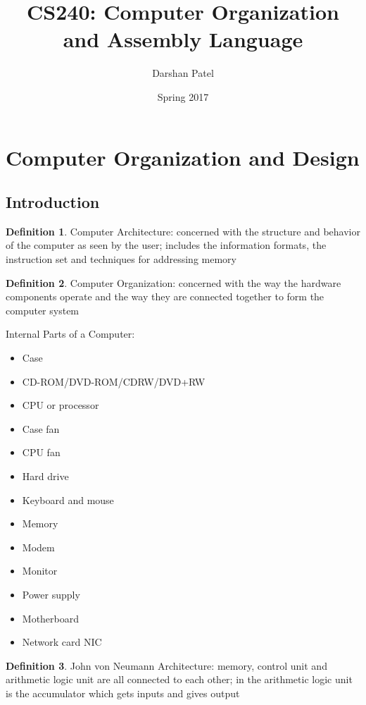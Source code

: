 \documentclass[12pt]{article}
\begin{document}
\theoremstyle{definition}
\newtheorem{theorem}{Theorem}[section]
\newtheorem{definition}{Definition}[section]
\newtheorem{example}{Example}[section]


\title{CS240: Computer Organization and Assembly Language}
\author{Darshan Patel}
\date{Spring 2017}
\maketitle

\tableofcontents

\section{Computer Organization and Design}
\subsection{Introduction} 
\begin{definition} Computer Architecture: concerned with the structure and behavior of the computer as seen by the user; includes the information formats, the instruction set and techniques for addressing memory \end{definition} 
\begin{definition} Computer Organization: concerned with the way the hardware components operate and the way they are connected together to form the computer system \end{definition} 
Internal Parts of a Computer: \begin{itemize} 
\item Case \item CD-ROM/DVD-ROM/CDRW/DVD+RW \item CPU or processor \item Case fan \item CPU fan \item Hard drive \item Keyboard and mouse \item Memory \item Modem \item Monitor \item Power supply \item Motherboard \item Network card NIC \end{itemize} 
\begin{definition} John von Neumann Architecture: memory, control unit and arithmetic logic unit are all connected to each other; in the arithmetic logic unit is the accumulator which gets inputs and gives output \end{definition} 
\end{document}
